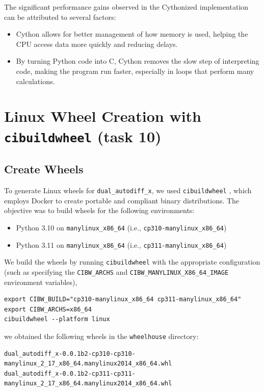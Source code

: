 \documentclass[12.5pt]{article}
\begin{document}
The significant performance gains observed in the Cythonized implementation can be attributed to several factors:
\begin{itemize}
    \item Cython allows for better management of how memory is used, helping the CPU access data more quickly and reducing delays.
    \item By turning Python code into C, Cython removes the slow step of interpreting code, making the program run faster, especially in loops that perform many calculations. \cite{wilbers2009using}
\end{itemize}
\newpage
\section{Linux Wheel Creation with \texttt{cibuildwheel} (task 10)}

\subsection*{Create Wheels}

To generate Linux wheels for \texttt{dual\_autodiff\_x}, we used \texttt{cibuildwheel} \cite{cibuild}, which employs Docker to create portable and compliant binary distributions. The objective was to build wheels for the following environments:

\begin{itemize}
    \item Python 3.10 on \texttt{manylinux\_x86\_64} (i.e., \texttt{cp310-manylinux\_x86\_64})
    \item Python 3.11 on \texttt{manylinux\_x86\_64} (i.e., \texttt{cp311-manylinux\_x86\_64})
\end{itemize}

We build the wheels by running \texttt{cibuildwheel} with the appropriate configuration (such as specifying the \texttt{CIBW\_ARCHS} and \texttt{CIBW\_MANYLINUX\_X86\_64\_IMAGE} environment variables), 

\begin{lstlisting}[frame=single]
export CIBW_BUILD="cp310-manylinux_x86_64 cp311-manylinux_x86_64"
export CIBW_ARCHS=x86_64
cibuildwheel --platform linux
\end{lstlisting}

we obtained the following wheels in the \texttt{wheelhouse} directory:

\begin{lstlisting}[frame=single]
dual_autodiff_x-0.0.1b2-cp310-cp310-manylinux_2_17_x86_64.manylinux2014_x86_64.whl
dual_autodiff_x-0.0.1b2-cp311-cp311-manylinux_2_17_x86_64.manylinux2014_x86_64.whl
\end{lstlisting}
\end{document}
